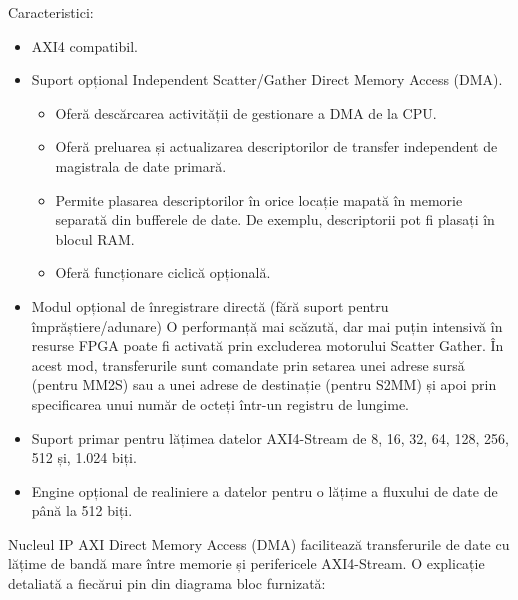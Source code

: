 \documentclass[12pt]{article}
\begin{document}
Caracteristici:
\begin{itemize}
    \item AXI4 compatibil.
    \item Suport opțional Independent Scatter/Gather Direct Memory Access (DMA).
    \begin{itemize}
        \item Oferă descărcarea activității de gestionare a DMA de la CPU.
        \item Oferă preluarea și actualizarea descriptorilor de transfer independent de magistrala de date primară.
        \item Permite plasarea descriptorilor în orice locație mapată în memorie separată din bufferele de date. De exemplu, descriptorii pot fi plasați în blocul RAM.
        \item Oferă funcționare ciclică opțională.
    \end{itemize}
    \item Modul opțional de înregistrare directă (fără suport pentru împrăștiere/adunare) O performanță mai scăzută, dar mai puțin intensivă în resurse FPGA poate fi activată prin excluderea motorului Scatter Gather. În acest mod, transferurile sunt comandate prin setarea unei adrese sursă (pentru MM2S) sau a unei adrese de destinație (pentru S2MM) și apoi prin specificarea unui număr de octeți într-un registru de lungime.
    \item Suport primar pentru lățimea datelor AXI4-Stream de 8, 16, 32, 64, 128, 256, 512 și, 1.024 biți.
    \item Engine opțional de realiniere a datelor pentru o lățime a fluxului de date de până la 512 biți.\\
\end{itemize}
\hspace*{1cm}Nucleul IP AXI Direct Memory Access (DMA) facilitează transferurile de date cu lățime de bandă mare între memorie și perifericele AXI4-Stream. O explicație detaliată a fiecărui pin din diagrama bloc furnizată:
\end{document}
